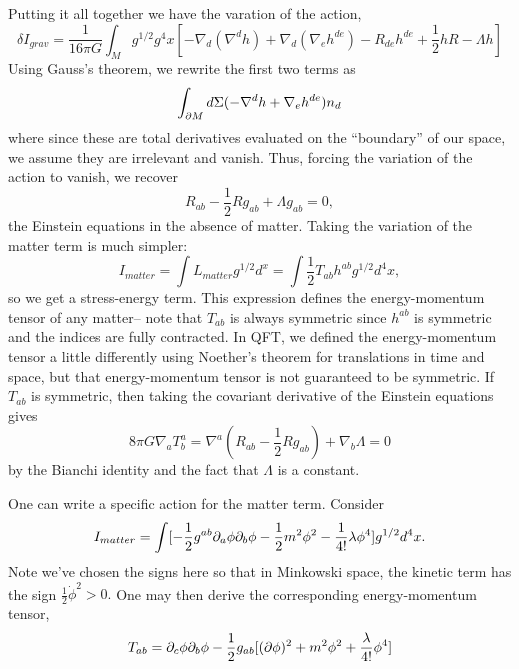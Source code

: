 Putting it all together we have the varation of the action,
$$
\delta I_{grav}=\frac{1}{16\pi G} \int_M g^{1/2} g^4 x \left[-\nabla_d (\nabla^d h) +\nabla_d (\nabla_e h^{de}) - R_{de} h^{de} +\frac{1}{2} h R - \Lambda h\right]$$
Using Gauss's theorem, we rewrite the first two terms as
$$\int_{\partial M}d \Sigma (-\nabla^d h + \nabla_e h^{de})n_d$$
where since these are total derivatives evaluated on the ``boundary'' of our space, we assume they are irrelevant and vanish. Thus, forcing the variation of the action to vanish, we recover
$$R_{ab}-\frac{1}{2}R g_{ab}+\Lambda g_{ab}=0,$$
the Einstein equations in the absence of matter. Taking the variation of the matter term is much simpler:
$$I_{matter}=\int L_{matter} g^{1/2}d^x = \int \frac{1}{2} T_{ab} h^{ab} g^{1/2} d^4x,$$
so we get a stress-energy term. This expression defines the energy-momentum tensor of any matter-- note that $T_{ab}$ is always symmetric since $h^{ab}$ is symmetric and the indices are fully contracted. In QFT, we defined the energy-momentum tensor a little differently using Noether's theorem for translations in time and space, but that energy-momentum tensor is not guaranteed to be symmetric. If $T_{ab}$ is symmetric, then taking the covariant derivative of the Einstein equations gives
$$8\pi G \nabla_a T^a_b= \nabla^a(R_{ab}-\frac{1}{2} R g_{ab})+\nabla_b \Lambda = 0$$
by the Bianchi identity and the fact that $\Lambda$ is a constant.

\begin{exm}
One can write a specific action for the matter term. Consider
$$I_{matter}=\int [-\frac{1}{2} g^{ab}\partial_a \phi \partial_b \phi-\frac{1}{2} m^2 \phi^2 -\frac{1}{4!} \lambda \phi^4] g^{1/2} d^4x.$$
Note we've chosen the signs here so that in Minkowski space, the kinetic term has the sign $\frac{1}{2} \dot \phi^2 >0.$ One may then derive the corresponding energy-momentum tensor,
$$T_{ab}=\partial_c \phi \partial_b \phi -\frac{1}{2} g_{ab}[(\partial\phi)^2+m^2\phi^2+\frac{\lambda}{4!}\phi^4]$$
\end{exm}